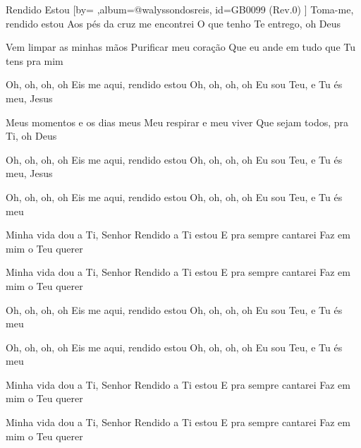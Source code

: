 \beginsong
{Rendido Estou %
}[by={ %
},album={@walyssondosreis},
id={GB0099 %
(Rev.0) %
}]
Toma-me, rendido estou
Aos pés da cruz me encontrei
O que tenho Te entrego, oh Deus

Vem limpar as minhas mãos
Purificar meu coração
Que eu ande em tudo que Tu tens pra mim

Oh, oh, oh, oh
Eis me aqui, rendido estou
Oh, oh, oh, oh
Eu sou Teu, e Tu és meu, Jesus

Meus momentos e os dias meus
Meu respirar e meu viver
Que sejam todos, pra Ti, oh Deus

Oh, oh, oh, oh
Eis me aqui, rendido estou
Oh, oh, oh, oh
Eu sou Teu, e Tu és meu, Jesus

Oh, oh, oh, oh
Eis me aqui, rendido estou
Oh, oh, oh, oh
Eu sou Teu, e Tu és meu

Minha vida dou a Ti, Senhor
Rendido a Ti estou
E pra sempre cantarei
Faz em mim o Teu querer

Minha vida dou a Ti, Senhor
Rendido a Ti estou
E pra sempre cantarei
Faz em mim o Teu querer

Oh, oh, oh, oh
Eis me aqui, rendido estou
Oh, oh, oh, oh
Eu sou Teu, e Tu és meu

Oh, oh, oh, oh
Eis me aqui, rendido estou
Oh, oh, oh, oh
Eu sou Teu, e Tu és meu

Minha vida dou a Ti, Senhor
Rendido a Ti estou
E pra sempre cantarei
Faz em mim o Teu querer

Minha vida dou a Ti, Senhor
Rendido a Ti estou
E pra sempre cantarei
Faz em mim o Teu querer


